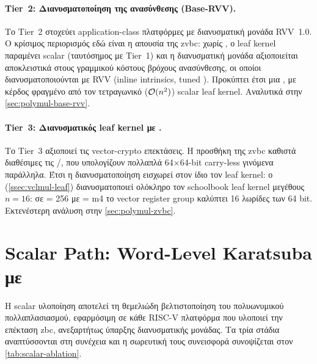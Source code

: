 \paragraph{Tier~2: Διανυσματοποίηση της ανασύνθεσης (Base-RVV).}
\label{ssec:tier2}

Το Tier~2 στοχεύει application-class πλατφόρμες με διανυσματική μονάδα
RVV~1.0. Ο κρίσιμος περιορισμός εδώ είναι η
απουσία της \gls{zvbc}: χωρίς \vclmul{}, ο leaf kernel παραμένει scalar
(ταυτόσημος με Tier~1) και η διανυσματική μονάδα αξιοποιείται αποκλειστικά
στους γραμμικού κόστους βρόχους ανασύνθεσης, οι οποίοι διανυσματοποιούνται με
RVV (inline intrinsics, tuned \LMUL). Προκύπτει έτσι μια , με κέρδος φραγμένο από τον τετραγωνικό
($\mathcal{O}(n^2)$) scalar leaf kernel. Αναλυτικά στην \cref{sec:polymul-base-rvv}.

\paragraph{Tier~3: Διανυσματικός leaf kernel με \Zvbc.}
\label{ssec:tier3}

Το Tier~3 αξιοποιεί τις vector-crypto επεκτάσεις. Η προσθήκη της
\gls{zvbc} καθιστά διαθέσιμες τις \vclmul/\vclmulh, που υπολογίζουν πολλαπλά
\num{64}$\times$\num{64}-bit carry-less γινόμενα παράλληλα. Έτσι η
διανυσματοποίηση εισχωρεί στον ίδιο τον leaf kernel: ο 
(\cref{ssec:vclmul-leaf}) διανυσματοποιεί ολόκληρο τον schoolbook leaf kernel
μεγέθους $n=16$: σε \VLEN = \num{256} με \LMUL = m4 το vector register group
καλύπτει \num{16} λωρίδες των \num{64} bit. Εκτενέστερη ανάλυση στην \cref{sec:polymul-zvbc}.

\section{Scalar Path: Word-Level Karatsuba με \Zbc}
\label{sec:polymul-scalar}

Η scalar υλοποίηση αποτελεί τη θεμελιώδη βελτιστοποίηση του πολυωνυμικού
πολλαπλασιασμού, εφαρμόσιμη σε κάθε RISC-V πλατφόρμα που υλοποιεί την επέκταση
\gls{zbc}, ανεξαρτήτως ύπαρξης διανυσματικής μονάδας.
Τα τρία στάδια αναπτύσσονται στη συνέχεια και η σωρευτική τους συνεισφορά
συνοψίζεται στον \cref{tab:scalar-ablation}.

